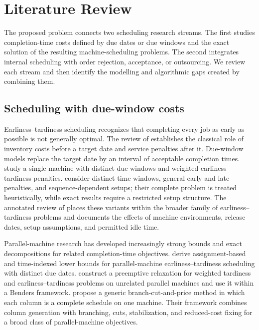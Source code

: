 \section{Literature Review}\label{sec:literature}

The proposed problem connects two scheduling research streams. The first studies
completion-time costs defined by due dates or due windows and the exact solution of
the resulting machine-scheduling problems. The second integrates internal
scheduling with order rejection, acceptance, or outsourcing. We review each stream
and then identify the modelling and algorithmic gaps created by combining them.

\subsection{Scheduling with due-window costs}

Earliness--tardiness scheduling recognizes that completing every job as early as
possible is not generally optimal. The review of \citet{baker1990review} establishes
the classical role of inventory costs before a target date and service penalties
after it. Due-window models replace the target date by an interval of acceptable
completion times. \citet{wan2002tabu} study a single machine with distinct due
windows and weighted earliness--tardiness penalties. \citet{rosa2017algorithms}
consider distinct time windows, general early and late penalties, and
sequence-dependent setups; their complete problem is treated heuristically, while
exact results require a restricted setup structure. The annotated review of
\citet{kramer2019unified} places these variants within the broader family of
earliness--tardiness problems and documents the effects of machine environments,
release dates, setup assumptions, and permitted idle time.

Parallel-machine research has developed increasingly strong bounds and exact
decompositions for related completion-time objectives.
\citet{kedad2008lowerbounds} derive assignment-based and time-indexed lower bounds
for parallel-machine earliness--tardiness scheduling with distinct due dates.
\citet{sen2015preemptive} construct a preemptive relaxation for weighted tardiness
and earliness--tardiness problems on unrelated parallel machines and use it within
a Benders framework. \citet{bulhoes2020exact} propose a generic
branch-cut-and-price method in which each column is a complete schedule on one
machine. Their framework combines column generation with branching, cuts,
stabilization, and reduced-cost fixing for a broad class of parallel-machine
objectives.

